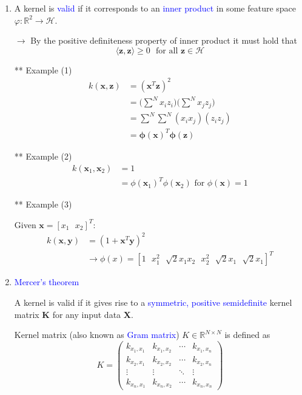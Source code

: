\documentclass[a4paper,10pt,twoside=true,DIV=10,headsepline,plainheadsepline]{scrartcl}
\begin{document}
			\begin{enumerate}
				\item A kernel is \textcolor{blue}{valid} if it corresponds to an \textcolor{blue}{inner product} in some feature space $\varphi : \mathbb{R}^2 \rightarrow \mathcal{H}$.
				
				$\rightarrow$ By the positive definiteness property of inner product it must hold that 
				\begin{equation} 
					\langle \mathbf{z}, \mathbf{z} \rangle \geq 0 \textrm{ } \textrm{for all } \mathbf{z} \in \mathcal{H}
				\end{equation}
					
				** Example (1)
				\begin{align} 
					k (\mathbf{x}, \mathbf{z}) &= (\mathbf{x}^T \mathbf{z})^2 \\
					&= \Big( \sum^N x_i z_i \Big) \Big( \sum^N x_j z_j \Big) \\
					&= \sum^N \sum^N ( x_i x_j ) (  z_i z_j ) \\
					&= \mathbf{\phi}(\mathbf{x})^T \mathbf{\phi}(\mathbf{z})
				\end{align}

				** Example (2)
				\begin{align} 
					k (\mathbf{x}_1, \mathbf{x}_2) &= 1 \\
					&= \phi (\mathbf{x}_1)^T \phi (\mathbf{x}_2) \textrm{ for } \phi (\mathbf{x}) = 1
				\end{align}

				** Example (3)

				Given $\mathbf{x} = [x_1 \textrm{ } x_2]^T$:
				\begin{align} 
					k (\mathbf{x}, \mathbf{y}) &= (1 +  \mathbf{x}^T \mathbf{y})^2 \\
					&\rightarrow \phi(x) = [1 \textrm{ } x_1^2 \textrm{ } \sqrt{2}x_1 x_2 \textrm{ } x_2^2 \textrm{ } \sqrt{2}x_1 \textrm{ } \sqrt{2}x_1]^T
				\end{align}

				\item \textcolor{blue}{Mercer’s theorem}
				\newline

					A kernel is valid if it gives rise to a \textcolor{blue}{symmetric, positive semidefinite} kernel matrix $\mathbf{K}$ for any input data $\mathbf{X}$.
	
				Kernel matrix (also known as \textcolor{blue}{Gram matrix}) $K \in \mathbb{R}^{N \times N}$ is defined as
				\begin{equation} 
					K = 
 						\begin{pmatrix}
  						k_{x_1,x_1} & k_{x_1,x_2} & \cdots & k_{x_1,x_n} \\
  						k_{x_2,x_1} & k_{x_2,x_2} & \cdots & k_{x_2,x_n} \\
  						\vdots  & \vdots  & \ddots & \vdots  \\
  						k_{x_n,x_1} & k_{x_n,x_2} & \cdots & k_{x_n,x_n}
 						\end{pmatrix}
				\end{equation}

			\end{enumerate}
\end{document}
